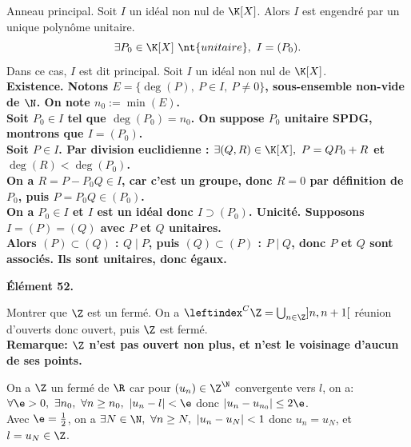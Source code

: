 \documentclass[11pt]{article}
\begin{document}
\begin{thm}{Anneau principal.}{}
    Soit $I$ un idéal non nul de $\K[X]$. Alors $I$ est engendré par un unique polynôme unitaire.
    \begin{equation*}
        \exists P_0 \in \K[X] ~\nt{unitaire}, ~ I=(P_0).
    \end{equation*}
    Dans ce cas, $I$ est dit principal.
    \tcblower
    Soit $I$ un idéal non nul de $\K[X]$.\\
    \bf{Existence.} Notons $E=\{\deg(P), ~ P\in I, ~ P\neq 0\}$, sous-ensemble non-vide de $\N$. On note $n_0:=\min(E)$.\\
    Soit $P_0\in I$ tel que $\deg(P_0)=n_0$. On suppose $P_0$ unitaire SPDG, montrons que $I=(P_0)$.\\
    \boxed{\subset} Soit $P\in I$. Par division euclidienne : $\exists (Q,R)\in\K[X], ~ P=QP_0+R$ et $\deg(R)<\deg(P_0)$.\\
    On a $R=P-P_0Q\in I$, car c'est un groupe, donc $R=0$ par définition de $P_0$, puis $P=P_0Q\in (P_0)$.\\
    \boxed{\supset} On a $P_0\in I$ et $I$ est un idéal donc $I \supset (P_0)$.\n
    \bf{Unicité.} Supposons $I=(P)=(Q)$ avec $P$ et $Q$ unitaires.\\
    Alors $(P)\subset(Q)$ : $Q \mid P$, puis $(Q)\subset(P)$ : $P\mid Q$, donc $P$ et $Q$ sont associés. Ils sont unitaires, donc égaux.
\end{thm}

\pagebreak

\begin{center}
    \bf{Élément 52.}
\end{center}

\begin{ex}{}{}
    Montrer que $\Z$ est un fermé.
    \tcblower
    On a $\leftindex^C\Z=\bigcup_{n\in\Z}]n,n+1[$ réunion d'ouverts donc ouvert, puis $\Z$ est fermé.\\
    \bf{Remarque:} $\Z$ n'est pas ouvert non plus, et n'est le voisinage d'aucun de ses points.
\end{ex}

\begin{ex}{}{}
    On a $\Z$ un fermé de $\R$ car pour $(u_n)\in\Z^\N$ convergente vers $l$, on a:\\
    $\forall \e > 0, ~ \exists n_0, ~ \forall n \geq n_0, ~ |u_n-l|<\e$ donc $|u_n-u_{n_0}|\leq2\e$.\\
    Avec $\e=\frac{1}{2}$, on a $\exists N \in \N, ~ \forall n \geq N, ~ |u_n-u_N|<1$ donc $u_n=u_N$, et $l=u_N\in\Z$.
\end{ex}
\end{document}
